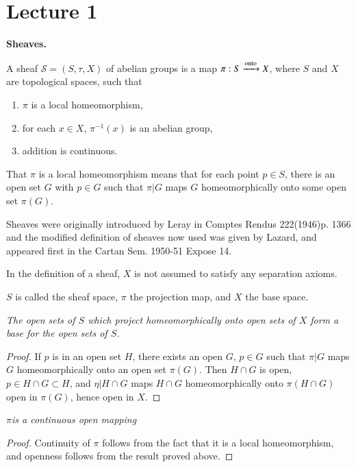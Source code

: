 \chapter{Lecture 1}

\noindent
\textbf{Sheaves.}\pageoriginale

\begin{defi*}
A sheaf $\mathscr{S} = (S, \tau, X)$ of abelian groups is a  map $\pi:
S \xrightarrow{\rm onto}X$, where  $S$ and $X$ are topological spaces,
such that  
\begin{enumerate}
\item $\pi$ is a local homeomorphism,

\item for each $x \in X$, $\pi^{-1} (x)$ is an abelian group,

\item addition is continuous.
\end{enumerate}
\end{defi*}

That $\pi$ is a local homeomorphism means that for each point $p \in
S$, there is an open set $G$ with $p \in G$ such that $\pi |G$ maps
$G$ homeomorphically onto some open set $\pi(G)$. 

Sheaves were originally introduced by Leray in Comptes Rendus
222(1946)p. 1366 and the modified definition of sheaves now used was
given by Lazard, and appeared first in the Cartan Sem. 1950-51
Expose 14. 

In the definition of a sheaf, $X$ is not assumed to satisfy any
separation axioms. 

$S$ is called the sheaf space, $\pi$ the projection map, and $X$ the
base space. 

\textit{The open sets of $S$ which project homeomorphically onto open
  sets of $X$ form a base for the open sets of $S$.}
 
\begin{proof}
If $p$ is in an open set $H$, there exists an open $G$, $p \in G$ such
that $\pi|G$ maps $G$ homeomorphically onto an open set $\pi
(G)$. Then $H \cap G$ is open, $p \in H \cap  G \subset H$, and
$\eta | H \cap G$ maps $H \cap G$ homeomorphically onto $\pi(H \cap
G)$ open in $\pi(G)$, hence open in $X$.  
\end{proof}

\textit{$\pi$\pageoriginale is a continuous open mapping}

\begin{proof}
Continuity of $\pi$ follows from the fact that it is a local
homeomorphism, and openness follows from the result proved above. 
\end{proof}

